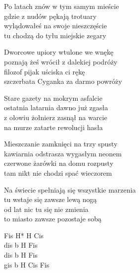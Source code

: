 \begin{textn}
    Po latach znów w tym samym mieście\\
    gdzie z nudów pękają trotuary\\
    wylądowałeś na swoje nieszczęście\\
    tu chodzą do tyłu miejskie zegary

    Dworcowe upiory wtulone we wnękę\\
    poznają żeś wrócił z dalekiej podróży\\
    filozof pijak uściska ci rękę\\
    szczerbata Cyganka za darmo powróży

    Stare gazety na mokrym asfalcie\\
    ostatnia latarnia dawno już zgasła\\
    z ołowiu żołnierz zasnął na warcie\\
    na murze zatarte rewolucji hasła

    Mieszczanie zamknięci na trzy spusty\\
    kawiarnia odstrasza wygasłym neonem\\
    czerwone żarówki na domu rozpusty\\
    tam nikt nie chodzi spać wieczorem

    Na świecie spełniają się wszystkie marzenia\\
    tu wstaje się zawsze lewą nogą\\
    od lat nic tu się nie zmienia\\
    to miasto zawsze pozostaje sobą
\end{textn}
\begin{chordw}
    Fis H* H Cis\\
    dis b H Fis\\
    dis b H Fis\\
    gis b H Cis Fis
\end{chordw}